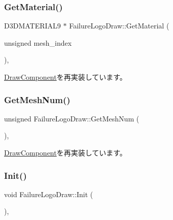 \subsubsection{\texorpdfstring{Get\+Material()}{GetMaterial()}}
{\footnotesize\ttfamily D3\+D\+M\+A\+T\+E\+R\+I\+A\+L9 $\ast$ Failure\+Logo\+Draw\+::\+Get\+Material (\begin{DoxyParamCaption}\item[{unsigned}]{mesh\+\_\+index }\end{DoxyParamCaption})\hspace{0.3cm}{\ttfamily [override]}, {\ttfamily [virtual]}}



\mbox{\hyperlink{class_draw_component_adae078d5139f691997763bf6cac9e25a}{Draw\+Component}}を再実装しています。

\mbox{\label{class_failure_logo_draw_a169800b9298e3186ef8b4aa82347e38e}} 
\subsubsection{\texorpdfstring{Get\+Mesh\+Num()}{GetMeshNum()}}
{\footnotesize\ttfamily unsigned Failure\+Logo\+Draw\+::\+Get\+Mesh\+Num (\begin{DoxyParamCaption}{ }\end{DoxyParamCaption})\hspace{0.3cm}{\ttfamily [override]}, {\ttfamily [virtual]}}



\mbox{\hyperlink{class_draw_component_a5f3bbcc8e563b740c0a5535170921c75}{Draw\+Component}}を再実装しています。

\mbox{\label{class_failure_logo_draw_a718d587edcabb1feea72153a79a65176}} 
\subsubsection{\texorpdfstring{Init()}{Init()}}
{\footnotesize\ttfamily void Failure\+Logo\+Draw\+::\+Init (\begin{DoxyParamCaption}{ }\end{DoxyParamCaption})\hspace{0.3cm}{\ttfamily [override]}, {\ttfamily [virtual]}}



